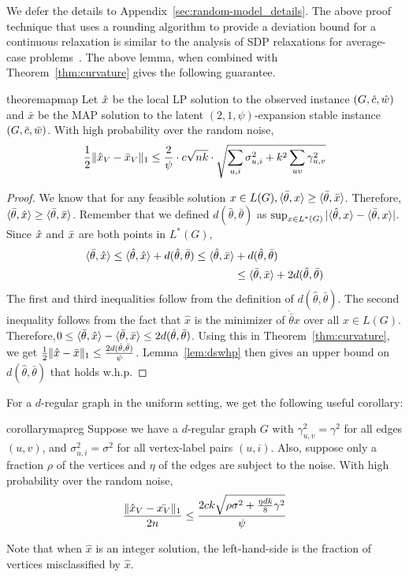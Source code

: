 We defer the details to Appendix~\ref{sec:random-model_details}. 
The above proof technique that uses a rounding algorithm to provide a deviation bound for a continuous relaxation is similar to the analysis of SDP relaxations for average-case problems~\citep[see e.g.,][]{MMVfas,guedon2016community}. 
The above lemma, when combined with Theorem~\ref{thm:curvature} gives the following guarantee. 

\begin{restatable}{theorem}{apmap}\label{thm:apmap}
Let $\hat{x}$ be the local LP solution to the observed instance $(G,\hat{c},\hat{w})$ and $\bar{x}$ be the MAP solution to the latent $(2,1,\psi)$-expansion stable instance $(G,\bar{c},\bar{w})$. With high probability over the random noise, \[ \frac{1}{2}\lVert \hat{x}_V - \bar{x}_V \rVert_1 \le \frac{2}{\psi} \cdot c\sqrt{nk} \cdot \sqrt{\sum_{u,i}\sigma_{u,i}^2 + k^2\sum_{uv}\gamma_{u,v}^2}\]

\end{restatable}
\begin{proof}
We know that for any feasible solution $x \in L(G), \langle \bar{\theta},x\rangle \ge \langle \bar{\theta},\bar{x}\rangle$. Therefore, $\langle \bar{\theta},\hat{x}\rangle \ge \langle \bar{\theta},\bar{x}\rangle$. Remember that we defined $d(\hat{\theta}, \bar{\theta})$ as $\sup_{x \in L^*(G)} | \langle \hat{\theta},x\rangle  - \langle \bar{\theta},x\rangle|$. Since $\hat{x}$ and $\bar{x}$ are both points in $L^*(G)$,
\begin{align*}
\langle \bar{\theta},\hat{x}\rangle \leq \langle \hat{\theta},\hat{x}\rangle + d(\hat{\theta},\bar{\theta}) \leq \langle \hat{\theta},\bar{x}\rangle &+ d(\hat{\theta},\bar{\theta}) \\
&\leq \langle \bar{\theta},\bar{x}\rangle + 2d(\hat{\theta},\bar{\theta})
\end{align*}
The first and third inequalities follow from the definition of $d(\hat{\theta},\bar{\theta})$. The second inequality follows from the fact that $\hat{x}$ is the minimizer of $\dot{\bar{\theta}}{x}$ over all $x \in L(G)$.
Therefore,$0 \le \langle \bar{\theta},\hat{x}\rangle - \langle \bar{\theta},\bar{x}\rangle \leq 2d(\hat{\theta},\bar{\theta})$. Using this in Theorem~\ref{thm:curvature}, we get $\frac{1}{2}\lVert \hat{x} - \bar{x} \rVert_1 \le \frac{2d(\hat{\theta},\bar{\theta})}{\psi}$. Lemma~\ref{lem:dswhp} then gives an upper bound on $d(\hat{\theta},\bar{\theta})$ that holds w.h.p.
\end{proof}

For a $d$-regular graph in the uniform setting, we get the following useful corollary:
\begin{restatable}{corollary}{mapreg}\label{cor:mapreg}
Suppose we have a $d$-regular graph $G$ with $\gamma_{u,v}^2 = \gamma^2$ for all edges $(u,v)$, and $\sigma_{u,i}^2 = \sigma^2$ for all vertex-label pairs $(u,i)$. Also, suppose only a fraction $\rho$ of the vertices and $\eta$ of the edges are subject to the noise. With high probability over the random noise, \[ \frac{\lVert \hat{x}_V - \bar{x_V} \rVert_1}{2n} \le \frac{2ck\sqrt{\rho \sigma^2 + \frac{\eta dk}{8}\gamma^2}}{\psi}\]
\end{restatable}
Note that when $\hat{x}$ is an integer solution, the left-hand-side is the fraction of vertices misclassified by $\hat{x}$.

